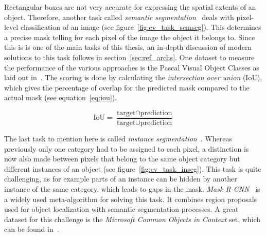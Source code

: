 Rectangular boxes are not very accurate for expressing the spatial extents of an object. Therefore, another task called \emph{semantic segmentation}~\cite{weakseg15} deals with pixel-level classification of an image (see figure~\ref{fig:cv_task_semseg}). This determines a precise mask telling for each pixel of the image the object it belongs to. Since this is is one of the main tasks of this thesis, an in-depth discussion of modern solutions to this task follows in section~\ref{sec:ref_archs}. One dataset to measure the performance of the various approaches is the Pascal Visual Object Classes as laid out in~\cite{pascal_voc15}. The scoring is done by calculating the \emph{intersection over union} (IoU), which gives the percentage of overlap for the predicted mask compared to the actual mask (see equation~\ref{eq:iou}).

\begin{equation}
    \label{eq:iou}
    \text{IoU} = \frac{\text{target} \cap \text{prediction}}{\text{target} \cup \text{prediction}}
\end{equation}

The last task to mention here is called \emph{instance segmentation}~\cite{mask-rcnn14}. Whereas previously only one category had to be assigned to each pixel, a distinction is now also made between pixels that belong to the same object category but different instances of an object (see figure~\ref{fig:cv_task_inseg}). This task is quite challenging, as for example parts of an instance can be hidden by another instance of the same category, which leads to gaps in the mask. \emph{Mask R-CNN}~\cite{mask-rcnn14} is a widely used meta-algorithm for solving this task. It combines region proposals used for object localization with semantic segmentation processes. A great dataset for this challenge is the \emph{Microsoft Common Objects in Context} set, which can be found in~\cite{coco15}.

